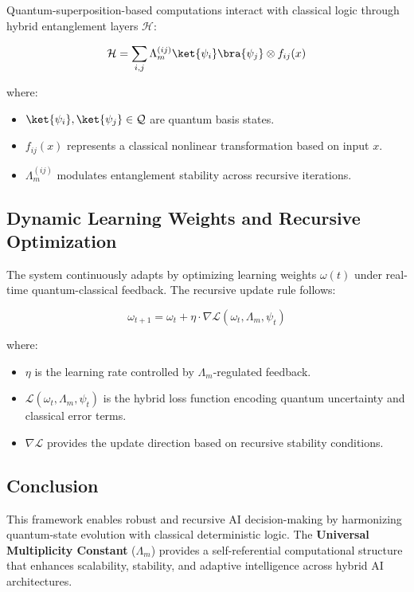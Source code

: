 \documentclass{article}
\theoremstyle{plain}
\begin{document}
Quantum-superposition-based computations interact with classical logic through hybrid entanglement layers $\mathcal{H}$:

\begin{equation}
    \mathcal{H} = \sum_{i,j} \Lambda_m^{(ij)} \ket{\psi_i} \bra{\psi_j} \otimes f_{ij}(x)
\end{equation}

where:
\begin{itemize}
    \item $\ket{\psi_i}, \ket{\psi_j} \in \mathcal{Q}$ are quantum basis states.
    \item $f_{ij}(x)$ represents a classical nonlinear transformation based on input $x$.
    \item $\Lambda_m^{(ij)}$ modulates entanglement stability across recursive iterations.
\end{itemize}

\subsection{Dynamic Learning Weights and Recursive Optimization}

The system continuously adapts by optimizing learning weights $\omega(t)$ under real-time quantum-classical feedback. The recursive update rule follows:

\begin{equation}
    \omega_{t+1} = \omega_t + \eta \cdot \nabla \mathcal{L}(\omega_t, \Lambda_m, \psi_t)
\end{equation}

where:
\begin{itemize}
    \item $\eta$ is the learning rate controlled by $\Lambda_m$-regulated feedback.
    \item $\mathcal{L}(\omega_t, \Lambda_m, \psi_t)$ is the hybrid loss function encoding quantum uncertainty and classical error terms.
    \item $\nabla \mathcal{L}$ provides the update direction based on recursive stability conditions.
\end{itemize}

\subsection{Conclusion}

This framework enables robust and recursive AI decision-making by harmonizing quantum-state evolution with classical deterministic logic. The \textbf{Universal Multiplicity Constant} ($\Lambda_m$) provides a self-referential computational structure that enhances scalability, stability, and adaptive intelligence across hybrid AI architectures.
\end{document}
